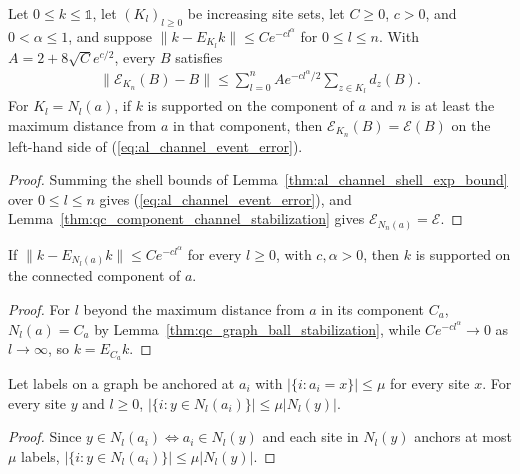 \begin{lemma}
    \label{thm:al_channel_event_error}
    \leanok
    Let $0\le k\le\mathbb 1$, let $(K_l)_{l\ge0}$ be increasing site sets, let
    $C\ge0$, $c>0$, and $0<\alpha\le1$, and suppose
    $\|k-E_{K_l}k\|\le Ce^{-cl^\alpha}$ for $0\le l\le n$. With
    $A=2+8\sqrt Ce^{c/2}$, every $B$ satisfies
    \begin{align}
        \|\mathcal E_{K_n}(B)-B\|\le\sum_{l=0}^nAe^{-cl^\alpha/2}
        \sum_{z\in K_l}d_z(B).
        \label{eq:al_channel_event_error}
    \end{align}
    For $K_l=N_l(a)$, if $k$ is supported on the component of $a$ and $n$ is at
    least the maximum distance from $a$ in that component, then
    $\mathcal E_{K_n}(B)=\mathcal E(B)$ on the left-hand side of
    (\ref{eq:al_channel_event_error}).
\end{lemma}
\begin{proof}\leanok
    Summing the shell bounds of Lemma~\ref{thm:al_channel_shell_exp_bound}
    over $0\le l\le n$ gives (\ref{eq:al_channel_event_error}), and
    Lemma~\ref{thm:qc_component_channel_stabilization} gives
    $\mathcal E_{N_n(a)}=\mathcal E$.
\end{proof}

\begin{lemma}
    \label{thm:al_component_support_of_tail}
    \leanok
    If $\|k-E_{N_l(a)}k\|\le Ce^{-cl^\alpha}$ for every $l\ge0$, with
    $c,\alpha>0$, then $k$ is supported on the connected component of $a$.
\end{lemma}
\begin{proof}\leanok
    For $l$ beyond the maximum distance from $a$ in its component $C_a$,
    $N_l(a)=C_a$ by Lemma~\ref{thm:qc_graph_ball_stabilization}, while
    $Ce^{-cl^\alpha}\to 0$ as $l\to\infty$, so $k=E_{C_a}k$.
\end{proof}

\begin{lemma}
    \label{thm:al_graph_ball_anchor_count}
    \leanok
    Let labels on a graph be anchored at $a_i$ with $|\{i:a_i=x\}|\le\mu$ for
    every site $x$. For every site $y$ and $l\ge0$,
    $|\{i:y\in N_l(a_i)\}|\le\mu|N_l(y)|$.
\end{lemma}
\begin{proof}\leanok
    Since $y\in N_l(a_i)\iff a_i\in N_l(y)$ and each site in $N_l(y)$ anchors
    at most $\mu$ labels, $|\{i:y\in N_l(a_i)\}|\le\mu|N_l(y)|$.
\end{proof}

